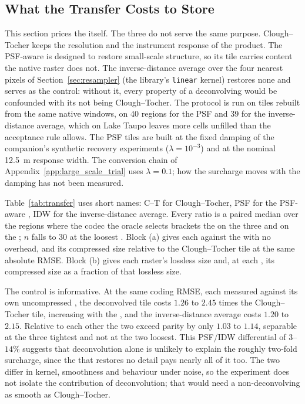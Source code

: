 \subsection{What the Transfer Costs to Store}
\label{sec:transfer_cost}
This section prices the  itself. The three 
do not serve the same purpose. Clough--Tocher keeps the resolution and
the instrument response of the product. The PSF-aware  is
designed to restore small-scale structure, so its tile carries content
the native raster does not. The inverse-distance average over the four
nearest pixels of Section~\ref{sec:resampler} (the library's
\texttt{linear} kernel) restores none and serves as the control: without
it, every property of a deconvolving  would be confounded
with its not being Clough--Tocher. The protocol is run on tiles rebuilt
from the same native windows, on 40 regions for the PSF 
and 39 for the inverse-distance average, which on Lake Taupo leaves
more cells unfilled than the acceptance rule allows. The PSF tiles are built at the
fixed damping of the companion's synthetic recovery experiments
($\lambda=10^{-3}$) and at the nominal \SI{12.5}{m} response width. The
conversion chain of Appendix~\ref{app:large_scale_trial} uses
$\lambda=0.1$; how the surcharge moves with the damping has not been
measured.

Table~\ref{tab:transfer} uses short names: C--T for Clough--Tocher, PSF
for the PSF-aware , IDW for the inverse-distance average.
Every ratio is a paired median over the regions where the codec the
oracle selects brackets the  on the three 
and on the ; $n$ falls to 30 at the loosest
. Block (a) gives each  against the
 with no overhead, and its compressed size relative to
the Clough--Tocher tile at the same absolute RMSE. Block (b) gives each
raster's lossless size and, at each , its compressed size as
a fraction of that lossless size.



The control is informative. At the same coding RMSE, each measured
against its own uncompressed , the deconvolved tile costs
$1.26$ to $2.45$ times the Clough--Tocher tile, increasing with the
, and the inverse-distance average costs $1.20$ to $2.15$.
Relative to each other the two exceed parity by only $1.03$ to $1.14$,
separable at the three tightest  and not at the two
loosest. This PSF/IDW differential of $3$--$14\%$ suggests that
deconvolution alone is unlikely to explain the roughly two-fold
surcharge, since the  that restores no detail pays nearly
all of it too. The two  differ in kernel, smoothness and
behaviour under noise, so the experiment does not isolate the
contribution of deconvolution; that would need a non-deconvolving
 as smooth as Clough--Tocher.

